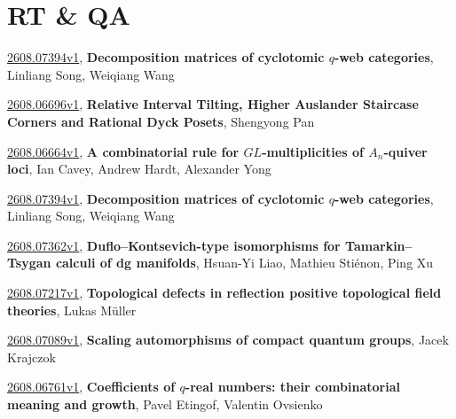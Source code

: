 \documentclass[9pt, a4paper]{article}
\theoremstyle{plain}
\theoremstyle{definition}
\theoremstyle{remark}
\newcommand{\arxiv}[3]{\href{https://arxiv.org/abs/#1}{#1}, \textbf{\textcolor{arxivblue}{#2}}, #3}
\begin{document}

\section{RT \& QA}
\arxiv{2608.07394v1}{Decomposition matrices of cyclotomic $q$-web categories}{Linliang Song, Weiqiang Wang}

\arxiv{2608.06696v1}{Relative Interval Tilting, Higher Auslander Staircase Corners and Rational Dyck Posets}{Shengyong Pan}

\arxiv{2608.06664v1}{A combinatorial rule for $GL$-multiplicities of $A_n$-quiver loci}{Ian Cavey, Andrew Hardt, Alexander Yong}

\arxiv{2608.07394v1}{Decomposition matrices of cyclotomic $q$-web categories}{Linliang Song, Weiqiang Wang}

\arxiv{2608.07362v1}{Duflo--Kontsevich-type isomorphisms for Tamarkin--Tsygan calculi of dg manifolds}{Hsuan-Yi Liao, Mathieu Stiénon, Ping Xu}

\arxiv{2608.07217v1}{Topological defects in reflection positive topological field theories}{Lukas Müller}

\arxiv{2608.07089v1}{Scaling automorphisms of compact quantum groups}{Jacek Krajczok}

\arxiv{2608.06761v1}{Coefficients of $q$-real numbers: their combinatorial meaning and growth}{Pavel Etingof, Valentin Ovsienko}

\end{document}
